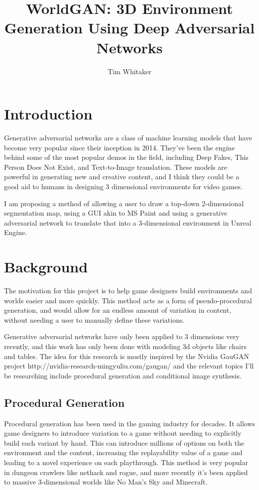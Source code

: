 \documentclass{article}
\title{WorldGAN: 3D Environment Generation Using Deep Adversarial Networks}
\author{Tim Whitaker}
\begin{document}
	\maketitle
	
	\section{Introduction}
	
	Generative adversarial networks are a class of machine learning models that have become very popular since their inception in 2014. They've been the engine behind some of the most popular demos in the field, including Deep Fakes, This Person Does Not Exist, and Text-to-Image translation. These models are powerful in generating new and creative content, and I think they could be a good aid to humans in designing 3 dimensional environments for video games.

	I am proposing a method of allowing a user to draw a top-down 2-dimensional segmentation map, using a GUI akin to MS Paint and using a generative adversarial network to translate that into a 3-dimensional environment in Unreal Engine. 

	\section{Background}

	The motivation for this project is to help game designers build environments and worlds easier and more quickly. This method acts as a form of pseudo-procedural generation, and would allow for an endless amount of variation in content, without needing a user to manually define these variations.
	
	Generative adversarial networks have only been applied to 3 dimensions very recently, and this work has only been done with modeling 3d objects like chairs and tables. The idea for this research is mostly inspired by the Nvidia GauGAN project http://nvidia-research-mingyuliu.com/gaugan/ and the relevant topics I'll be researching include procedural generation and conditional image synthesis.
	
	\subsection{Procedural Generation}
	
	Procedural generation has been used in the gaming industry for decades. It allows game designers to introduce variation to a game without needing to explicitly build each variant by hand. This can introduce millions of options on both the environment and the content, increasing the replayability value of a game and leading to a novel experience on each playthrough. This method is very popular in dungeon crawlers like nethack and rogue, and more recently it's been applied to massive 3-dimensional worlds like No Man's Sky and Minecraft.
		
\end{document}
